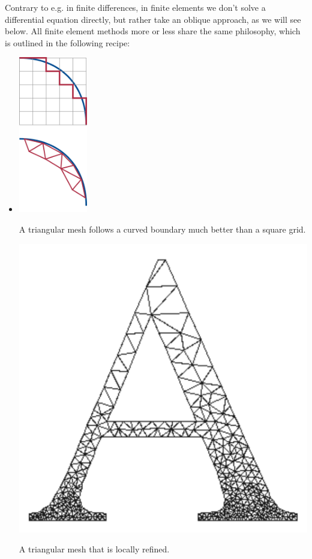 Contrary to e.g. in finite differences, in finite elements we don't solve a differential equation directly, but rather take an oblique approach, as we will see below. All finite element methods more or less share the same philosophy, which is outlined in the following recipe:

\begin{itemize}
\item

\begin{marginfigure}
\centering
\includegraphics[width=3cm]{numeric/figures/staircase}
\caption{A triangular mesh follows a curved boundary much better than a square grid.}
\label{fig-staircasing}
\end{marginfigure}

\begin{marginfigure}
\centering
\includegraphics[scale=0.5]{numeric/figures/grid}
\caption{A triangular mesh that is locally refined.}
\label{fig-grid}
\end{marginfigure}


\end{itemize}
